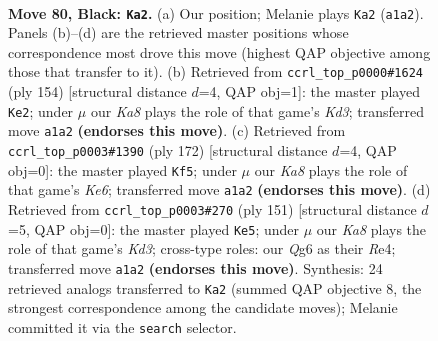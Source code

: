 \documentclass[11pt]{article}
\begin{document}
\clearpage

\begin{figure}[p]\centering
\begin{subfigure}{0.46\textwidth}\centering
\resizebox{\linewidth}{!}{%
\newchessgame
\chessboard[
  setfen={7K/8/6q1/8/1Q6/8/8/k7 b - - 1 80},
  showmover=false,
  pgfstyle=straightmove, color=movearrow, markmove={a1-a2}
]}
\caption{}
\end{subfigure}\hfill
\begin{subfigure}{0.46\textwidth}\centering
\resizebox{\linewidth}{!}{%
\newchessgame
\chessboard[
  setfen={1Q6/8/8/8/8/q2K3k/8/8 w - - 3 78},
  showmover=false,
  pgfstyle=straightmove, color=movearrow, markmove={d3-e2}
]}
\caption{}
\end{subfigure}
\\[4pt]
\begin{subfigure}{0.46\textwidth}\centering
\resizebox{\linewidth}{!}{%
\newchessgame
\chessboard[
  setfen={8/8/4K3/7k/8/6Q1/8/8 w - - 6 87},
  showmover=false,
  pgfstyle=straightmove, color=movearrow, markmove={e6-f5}
]}
\caption{}
\end{subfigure}\hfill
\begin{subfigure}{0.46\textwidth}\centering
\resizebox{\linewidth}{!}{%
\newchessgame
\chessboard[
  setfen={8/8/3k2K1/8/4r3/1Q6/8/8 b - - 10 76},
  showmover=false,
  pgfstyle=straightmove, color=movearrow, markmove={d6-e5}
]}
\caption{}
\end{subfigure}
\caption{\textbf{Move 80, Black: \texttt{Ka2}.} (a) Our position; Melanie plays \texttt{Ka2} (\texttt{a1a2}). Panels (b)--(d) are the retrieved master positions whose correspondence most drove this move (highest QAP objective among those that transfer to it). (b) Retrieved from \texttt{ccrl\_top\_p0000\#1624} (ply 154) [structural distance $d$=4, QAP obj=1]: the master played \texttt{Ke2}; under $\mu$ our \emph{Ka8} plays the role of that game's \emph{Kd3}; transferred move \texttt{a1a2} \textbf{(endorses this move)}. (c) Retrieved from \texttt{ccrl\_top\_p0003\#1390} (ply 172) [structural distance $d$=4, QAP obj=0]: the master played \texttt{Kf5}; under $\mu$ our \emph{Ka8} plays the role of that game's \emph{Ke6}; transferred move \texttt{a1a2} \textbf{(endorses this move)}. (d) Retrieved from \texttt{ccrl\_top\_p0003\#270} (ply 151) [structural distance $d$=5, QAP obj=0]: the master played \texttt{Ke5}; under $\mu$ our \emph{Ka8} plays the role of that game's \emph{Kd3}; cross-type roles: our \emph{Q}g6 as their \emph{R}e4; transferred move \texttt{a1a2} \textbf{(endorses this move)}. Synthesis: 24 retrieved analogs transferred to \texttt{Ka2} (summed QAP objective 8, the strongest correspondence among the candidate moves); Melanie committed it via the \texttt{search} selector.}
\label{fig:thought-m159}
\end{figure}
\end{document}
